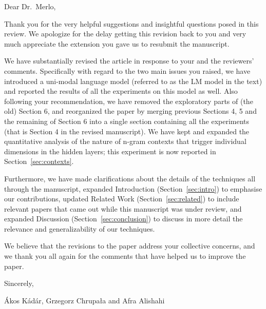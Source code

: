 \newpage
{}

\noindent
Dear Dr.~Merlo,
\newline

Thank you for the very helpful suggestions and insightful questions
posed in this review.  We apologize for the delay getting this
revision back to you and very much appreciate the extension you 
gave us to resubmit the manuscript.

We have substantially revised the article in response to your and the reviewers' 
comments. Specifically with regard to the two main issues you raised, we have 
introduced a uni-modal language model (referred to as the {\sc LM} model in the text) 
and reported the results of all the experiments on this model as well. Also following 
your recommendation, we have removed the exploratory parts of (the old) Section 6, 
and reorganized the paper by merging previous Sections 4, 5 and the remaining of 
Section 6 into a single section containing all the experiments (that is Section 4 in the 
revised manuscript). We have kept and expanded the quantitative analysis of the nature of 
n-gram contexts that trigger individual dimensions in the hidden layers; this experiment is 
now reported in Section~\ref{sec:contexts}.

Furthermore, we have made clarifications about the details of the techniques all 
through the manuscript, expanded Introduction (Section~\ref{sec:intro}) to 
emphasise our contributions, updated Related Work (Section~\ref{sec:related}) 
to include relevant papers that came out while this manuscript was under review, and expanded Discussion (Section~\ref{sec:conclusion}) to discuss in more detail the relevance and generalizability of our techniques. 

We believe that the revisions to the paper address your collective
concerns, and we thank you all again for the comments that have helped
us to improve the paper.
\newline

\noindent
Sincerely,
\newline

\noindent
Ákos Kádár, Grzegorz Chrupała and Afra Alishahi
\newline


